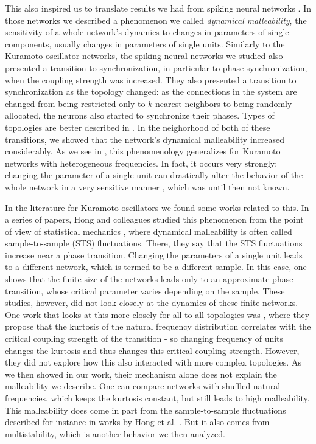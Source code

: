 This also inspired us to translate results we had from spiking neural networks \cite{budzinski2020synchronization}. In those networks we described a phenomenon we called \textit{dynamical malleability}, the sensitivity of a whole network's dynamics to changes in parameters of single components, usually changes in parameters of single units. Similarly to the Kuramoto oscillator networks, the spiking neural networks we studied also presented a transition to synchronization, in particular to phase synchronization, when the coupling strength was increased. They also presented a transition to synchronization as the topology changed: as the connections in the system are changed from being restricted only to $k$-nearest neighbors to being randomly allocated, the neurons also started to synchronize their phases. Types of topologies are better described in . In the neighorhood of both of these transitions, we showed that the network's dynamical malleability increased considerably. As we see in , this phenomenology generalizes for Kuramoto networks with heterogeneous frequencies. In fact, it occurs very strongly: changing the parameter of a single unit can drastically alter the behavior of the whole network in a very sensitive manner \cite{rossi2022shifts}, which was until then not known. 

In the literature for Kuramoto oscillators we found some works related to this. In a series of papers, Hong and colleagues studied this phenomenon from the point of view of statistical mechanics \cite{hong2007entrainment, hong2007finitesizescalingpre}, where dynamical malleability is often called sample-to-sample (STS) fluctuations. There, they say that the STS fluctuations increase near a phase transition. Changing the parameters of a single unit leads to a different network, which is termed to be a different sample. In this case, one shows that the finite size of the networks leads only to an approximate phase transition, whose critical parameter varies depending on the sample. These studies, however, did not look closely at the dynamics of these finite networks. One work that looks at this more closely for all-to-all topologies was , where they propose that the kurtosis of the natural frequency distribution correlates with the critical coupling strength of the transition - so changing frequency of units changes the kurtosis and thus changes this critical coupling strength. However, they did not explore how this also interacted with more complex topologies. As we then showed in our work, their mechanism alone does not explain the malleability we describe. One can compare networks with shuffled natural frequencies, which keeps the kurtosis constant, but still leads to high malleability. This malleability does come in part from the sample-to-sample fluctuations described for instance in works by Hong et al. \cite{hong2007entrainment}. But it also comes from multistability, which is another behavior we then analyzed. 

